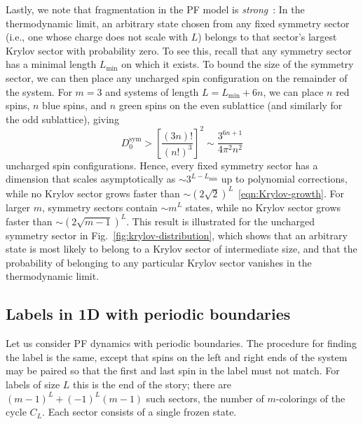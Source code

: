 Lastly, we note that fragmentation in the PF model is \emph{strong}~\cite{Khemani2020Localization, Sala2020Fragmentation}: In the thermodynamic limit, an arbitrary state chosen from any fixed symmetry sector (i.e., one whose charge does not scale with $L$) belongs to that sector's largest Krylov sector with probability zero. To see this, recall that any symmetry sector has a minimal length $L_\text{min}$ on which it exists. To bound the size of the symmetry sector, we can then place any uncharged spin configuration on the remainder of the system. For $m=3$ and systems of length $L=L_\text{min}+6n$, we can place $n$ red spins, $n$ blue spins, and $n$ green spins on the even sublattice (and similarly for the odd sublattice), giving 
%
%
\begin{equation}
    D^\text{sym}_0 > {\left[ \frac{(3n)!}{(n!)^3} \right]}^2 \sim \frac{3^{6 n+1}}{4 \pi ^2 n^2}
\end{equation}
%
%
uncharged spin configurations.
Hence, every fixed symmetry sector has a dimension that scales asymptotically as $\sim 3^{L-L_\text{min}}$ up to polynomial corrections, while no Krylov sector grows faster than $\sim (2\sqrt{2})^L$~\eqref{eqn:Krylov-growth}.  
For larger $m$, symmetry sectors contain $\sim m^L$ states, while no Krylov sector grows faster than $\sim(2\sqrt{m-1})^L$.
This result is illustrated for the uncharged symmetry sector in Fig.~\ref{fig:krylov-distribution}, which shows that an arbitrary state is most likely to belong to a Krylov sector of intermediate size, and that the probability of belonging to any particular Krylov sector vanishes in the thermodynamic limit.


\subsection{Labels in 1D with periodic boundaries}

Let us consider PF dynamics with periodic boundaries.
The procedure for finding the label is the same, except that spins on the left and right ends of the system may be paired so that the first and last spin in the label must not match. For labels of size $L$ this is the end of the story; there are $(m-1)^L + (-1)^L(m-1)$ such sectors, the number of $m$-colorings of the cycle $C_L$. Each sector consists of a single frozen state.

